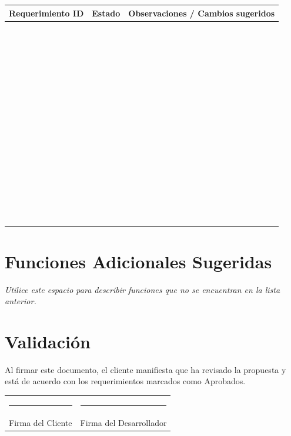\documentclass[12pt,a4paper]{article}
\begin{document}
	\begin{table}[h!]
		\centering
		\begin{tabular}{|p{4cm}|p{2cm}|p{8cm}|}
			\hline
			\textbf{Requerimiento ID} & \textbf{Estado} & \textbf{Observaciones / Cambios sugeridos} \\ \hline
			&  &  \\ \hline
			&  &  \\ \hline
			&  &  \\ \hline
			&  &  \\ \hline
			&  &  \\ \hline
			&  &  \\ \hline
			&  &  \\ \hline
			&  &  \\ \hline
			&  &  \\ \hline
			&  &  \\ \hline
			&  &  \\ \hline
			&  &  \\ \hline
			&  &  \\ \hline
			&  &  \\ \hline
		\end{tabular}
	\end{table}
	
	\section{Funciones Adicionales Sugeridas}
	\textit{Utilice este espacio para describir funciones que no se encuentran en la lista anterior.}
	\vspace{4cm}
	
	\section{Validación}
	Al firmar este documento, el cliente manifiesta que ha revisado la propuesta y está de acuerdo con los requerimientos marcados como Aprobados.
	
	\vspace{2cm}
	\begin{center}
		\begin{tabular}{cc}
			\rule{5cm}{1pt} & \hspace{2cm} \rule{5cm}{1pt} \\
			Firma del Cliente & \hspace{2cm} Firma del Desarrollador
		\end{tabular}
	\end{center}
	
\end{document}
